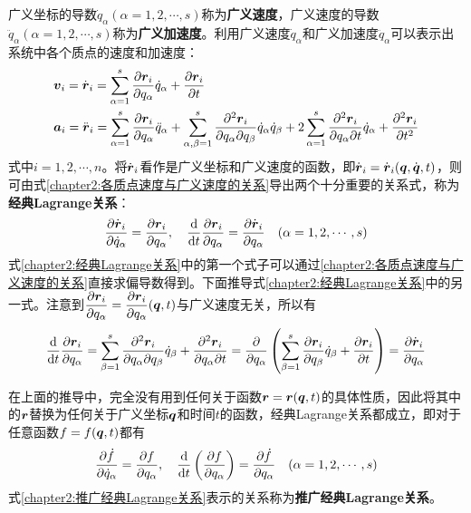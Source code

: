 广义坐标的导数$\dot{q}_\alpha(\alpha=1,2,\cdots,s)$称为{\bf 广义速度}，广义速度的导数$\ddot{q}_\alpha(\alpha=1,2,\cdots,s)$称为{\bf 广义加速度}。利用广义速度$\dot{q}_\alpha$和广义加速度$\ddot{q}_\alpha$可以表示出系统中各个质点的速度和加速度：
\begin{align}
	 & \boldsymbol{v}_i = \dot{\boldsymbol{r}}_i = \sum_{\alpha=1}^s \frac{\partial \boldsymbol{r}_i}{\partial q_\alpha}\dot{q}_\alpha+\frac{\partial \boldsymbol{r}_i}{\partial t} \label{chapter2:各质点速度与广义速度的关系} \\
	 & \boldsymbol{a}_i = \ddot{\boldsymbol{r}}_i = \sum_{\alpha=1}^s \frac{\partial \boldsymbol{r}_i}{\partial q_\alpha}\ddot{q}_\alpha + \sum_{\alpha,\beta=1}^s \frac{\partial^2 \boldsymbol{r}_i}{\partial q_\alpha\partial q_\beta}\dot{q}_\alpha\dot{q}_\beta + 2\sum_{\alpha=1}^s\frac{\partial^2 \boldsymbol{r}_i}{\partial q_\alpha\partial t} \dot{q}_\alpha + \frac{\partial^2 \boldsymbol{r}_i}{\partial t^2} \label{chapter2:各质点加速度与广义速度和广义加速度的关系}
\end{align}
式中$i=1,2,\cdots,n$。将$\dot{\boldsymbol{r}}_i$看作是广义坐标和广义速度的函数，即$\dot{\boldsymbol{r}}_i=\dot{\boldsymbol{r}}_i(\boldsymbol{q},\dot{\boldsymbol{q}},t)$，则可由式\eqref{chapter2:各质点速度与广义速度的关系}导出两个十分重要的关系式，称为{\bf 经典Lagrange关系}：
\begin{equation}
	\frac{\partial \dot{\boldsymbol{r}}_i}{\partial \dot{q}_\alpha} = \frac{\partial \boldsymbol{r}_i}{\partial q_\alpha}, \quad \frac{\mathrm{d}}{\mathrm{d} t}\frac{\partial \boldsymbol{r}_i}{\partial q_\alpha} = \frac{\partial \dot{\boldsymbol{r}}_i}{\partial q_\alpha}\quad (\alpha=1,2,\cdots,s)
	\label{chapter2:经典Lagrange关系}
\end{equation}
式\eqref{chapter2:经典Lagrange关系}中的第一个式子可以通过\eqref{chapter2:各质点速度与广义速度的关系}直接求偏导数得到。下面推导式\eqref{chapter2:经典Lagrange关系}中的另一式。注意到$\dfrac{\partial \boldsymbol{r}_i}{\partial q_\alpha}=\dfrac{\partial \boldsymbol{r}_i}{\partial q_\alpha}(\boldsymbol{q},t)$与广义速度无关，所以有
\begin{equation*}
	\frac{\mathrm{d}}{\mathrm{d} t}\frac{\partial \boldsymbol{r}_i}{\partial q_\alpha} = \sum_{\beta=1}^s \frac{\partial^2 \boldsymbol{r}_i}{\partial q_\alpha\partial q_\beta}\dot{q}_\beta + \frac{\partial^2 \boldsymbol{r}_i}{\partial q_\alpha\partial t} = \frac{\partial}{\partial q_\alpha} \left(\sum_{\beta=1}^s \frac{\partial \boldsymbol{r}_i}{\partial q_\beta}\dot{q}_\beta + \frac{\partial \boldsymbol{r}_i}{\partial t}\right) = \frac{\partial \dot{\boldsymbol{r}}_i}{\partial q_\alpha}
\end{equation*}

在上面的推导中，完全没有用到任何关于函数$\boldsymbol{r}=\boldsymbol{r}(\boldsymbol{q},t)$的具体性质，因此将其中的$\boldsymbol{r}$替换为任何关于广义坐标$\boldsymbol{q}$和时间$t$的函数，经典Lagrange关系都成立，即对于任意函数$f=f(\boldsymbol{q},t)$都有
\begin{equation}
	\frac{\partial \dot{f}}{\partial \dot{q}_\alpha} = \frac{\partial f}{\partial q_\alpha}, \quad \frac{\mathrm{d}}{\mathrm{d} t}\left(\frac{\partial f}{\partial q_\alpha}\right) = \frac{\partial \dot{f}}{\partial q_\alpha}\quad (\alpha=1,2,\cdots,s)
	\label{chapter2:推广经典Lagrange关系}
\end{equation}
式\eqref{chapter2:推广经典Lagrange关系}表示的关系称为{\bf 推广经典Lagrange关系}。

